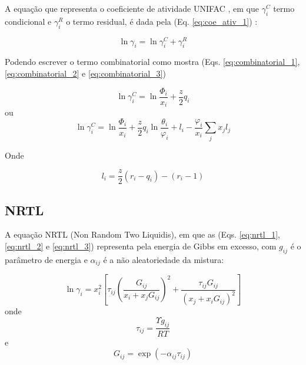 	A equação que representa o coeficiente de atividade UNIFAC , em que $\gamma_{i}^{C}$ termo condicional e $\gamma_{i}^{R}$ o termo residual, é dada pela (Eq. \ref{eq:coe_ativ_1}) \cite{Rocha2011}:
	
	\begin{equation}\label{eq:coe_ativ_1}
	\ln\gamma_{i}=\ln\gamma_{i}^{C}+\gamma_{i}^{R}
	\end{equation}
	
	Podendo escrever o termo combinatorial como mostra (Eqs. \ref{eq:combinatorial_1}, \ref{eq:combinatorial_2} e \ref{eq:combinatorial_3})
	
	\begin{equation}\label{eq:combinatorial_1}
	\ln\gamma_{i}^{C}=\ln\frac{\Phi_{i}}{x_{i}}+\frac{z}{2}q_{i}
	\end{equation}
	ou
	\begin{equation}\label{eq:combinatorial_2}
	\ln\gamma_{i}^{C}=\ln\frac{\Phi_{i}}{x_{i}}+\frac{z}{2}q_{i}\ln\frac{\theta_{i}}{\varphi_{i}}+l_{i}-\frac{\varphi_{i}}{x_{i}}\sum_{j}x_{j}l_{j}
	\end{equation}
	
	Onde
	
	\begin{equation}\label{eq:combinatorial_3}
	l_{i}=\frac{z}{2}(r_{i}-q_{i})-(r_{i}-1)
	\end{equation}
	
	\subsection{NRTL}
	
	A equação NRTL (Non Random Two Liquidis), em que as (Eqs. \ref{eq:nrtl_1}, \ref{eq:nrtl_2} e \ref{eq:nrtl_3}) representa pela energia de Gibbs em excesso, com $g_{ij}$ é o parâmetro de energia e $\alpha_{ij}$ é a não aleatoriedade da mistura:
	
	\begin{equation}\label{eq:nrtl_1}
	\ln\gamma_{i}=x_{i}^{2}\left[\tau_{ij} \left(\frac{G_{ij}}{x_{i}+x_{j}G_{ij}}\right)^{2}+\frac{\tau_{ij}G_{ij}}{(x_j+x_iG_{ij})^2}\right]
	\end{equation}
	onde
	\begin{equation}\label{eq:nrtl_2}
	\tau_{ij}=\frac{\Upsilon g_{ij}}{RT}
	\end{equation}
	e
	\begin{equation}\label{eq:nrtl_3}
	G_{ij}=\exp(-\alpha_{ij}\tau_{ij})
	\end{equation}
	
